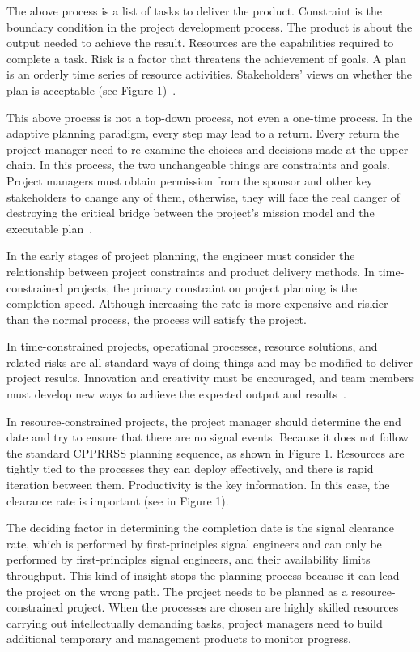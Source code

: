 \documentclass{sigchi}
\begin{document}
 The above process is a list of tasks to deliver the product. Constraint is the boundary condition in the project development process. The product is about the output needed to achieve the result. Resources are the capabilities required to complete a task. Risk is a factor that threatens the achievement of goals. A plan is an orderly time series of resource activities. Stakeholders’ views on whether the plan is acceptable (see Figure 1)~\cite{van_der_waldt_adaptive_2011}.

This above process is not a top-down process, not even a one-time process. In the adaptive planning paradigm, every step may lead to a return. Every return the project manager need to re-examine the choices and decisions made at the upper chain. In this process, the two unchangeable things are constraints and goals. Project managers must obtain permission from the sponsor and other key stakeholders to change any of them, otherwise, they will face the real danger of destroying the critical bridge between the project’s mission model and the executable plan~\cite{van_der_waldt_adaptive_2011}.

In the early stages of project planning, the engineer must consider the relationship between project constraints and product delivery methods. In time-constrained projects, the primary constraint on project planning is the completion speed. Although increasing the rate is more expensive and riskier than the normal process, the process will satisfy the project.

In time-constrained projects, operational processes, resource solutions, and related risks are all standard ways of doing things and may be modified to deliver project results. Innovation and creativity must be encouraged, and team members must develop new ways to achieve the expected output and results~\cite{boehm_software_2001,van_der_waldt_adaptive_2011}.

In resource-constrained projects, the project manager should determine the end date and try to ensure that there are no signal events. Because it does not follow the standard CPPRRSS planning sequence, as shown in Figure 1. Resources are tightly tied to the processes they can deploy effectively, and there is rapid iteration between them. Productivity is the key information. In this case, the clearance rate is important (see in Figure 1). 

The deciding factor in determining the completion date is the signal clearance rate, which is performed by first-principles signal engineers and can only be performed by first-principles signal engineers, and their availability limits throughput. This kind of insight stops the planning process because it can lead the project on the wrong path. The project needs to be planned as a resource-constrained project. When the processes are chosen are highly skilled resources carrying out intellectually demanding tasks, project managers need to build additional temporary and management products to monitor progress.
\end{document}
